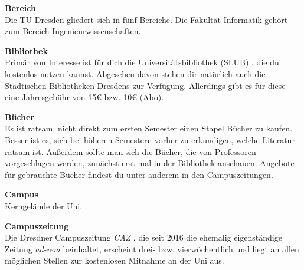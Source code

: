 \begin{multicols}{2}

\textbf{Bereich} \\
Die TU Dresden gliedert sich in fünf Bereiche.
Die Fakultät Informatik gehört zum Bereich Ingenieurwissenschaften.


\textbf{Bibliothek} \\
Primär von Interesse ist für dich die Universitätsbibliothek (SLUB) , die du kostenlos nutzen kannst.
Abgesehen davon stehen dir natürlich auch die Städtischen Bibliotheken Dresdens zur Verfügung.
Allerdings gibt es für diese eine Jahresgebühr von 15\euro{} bzw. 10\euro{} (Abo).

\textbf{Bücher} \\
Es ist ratsam, nicht direkt zum ersten Semester einen Stapel Bücher zu kaufen.
Besser ist es, sich bei höheren Semestern vorher zu erkundigen, welche Literatur ratsam ist.
Außerdem sollte man sich die Bücher, die von Professoren vorgeschlagen werden, zunächst erst mal in der Bibliothek anschauen.
Angebote für gebrauchte Bücher findest du unter anderem in den Campuszeitungen.

\textbf{Campus} \\
Kerngelände der Uni.

\vfill\columnbreak

\textbf{Campuszeitung} \\
Die Dresdner Campuszeitung \textit{CAZ} , die seit 2016 die ehemalig eigenständige Zeitung \textit{ad-rem} beinhaltet, erscheint drei- bzw. vierwöchentlich und liegt an allen möglichen Stellen zur kostenlosen Mitnahme an der Uni aus.


\end{multicols}
